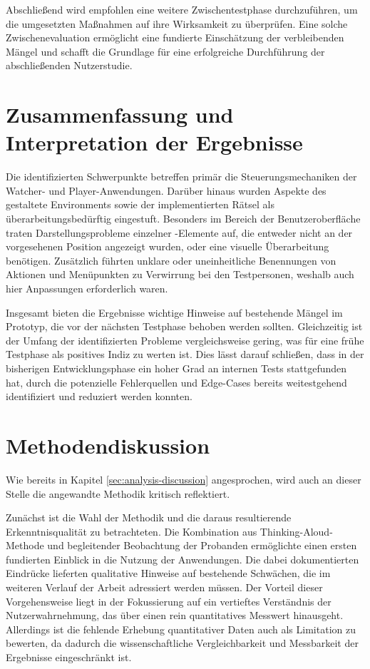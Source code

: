 Abschließend wird empfohlen eine weitere Zwischentestphase durchzuführen, um die umgesetzten Maßnahmen auf ihre Wirksamkeit zu überprüfen. Eine solche Zwischenevaluation ermöglicht eine fundierte Einschätzung der verbleibenden Mängel und schafft die Grundlage für eine erfolgreiche Durchführung der abschließenden Nutzerstudie.

\section{Zusammenfassung und Interpretation der Ergebnisse}

Die identifizierten Schwerpunkte betreffen primär die Steuerungsmechaniken der Watcher- und Player-Anwendungen. Darüber hinaus wurden Aspekte des gestaltete Environments sowie der implementierten Rätsel als überarbeitungsbedürftig eingestuft. Besonders im Bereich der Benutzeroberfläche traten Darstellungsprobleme einzelner -Elemente auf, die entweder nicht an der vorgesehenen Position angezeigt wurden, oder eine visuelle Überarbeitung benötigen. Zusätzlich führten unklare oder uneinheitliche Benennungen von Aktionen und Menüpunkten zu Verwirrung bei den Testpersonen, weshalb auch hier Anpassungen erforderlich waren.

Insgesamt bieten die Ergebnisse wichtige Hinweise auf bestehende Mängel im Prototyp, die vor der nächsten Testphase behoben werden sollten. Gleichzeitig ist der Umfang der identifizierten Probleme vergleichsweise gering, was für eine frühe Testphase als positives Indiz zu werten ist. Dies lässt darauf schließen, dass in der bisherigen Entwicklungsphase ein hoher Grad an internen Tests stattgefunden hat, durch die potenzielle Fehlerquellen und Edge-Cases bereits weitestgehend identifiziert und reduziert werden konnten.

\section{Methodendiskussion}

Wie bereits in Kapitel \ref{sec:analysis-discussion} angesprochen, wird auch an dieser Stelle die angewandte Methodik kritisch reflektiert.

Zunächst ist die Wahl der Methodik und die daraus resultierende Erkenntnisqualität zu betrachteten. Die Kombination aus Thinking-Aloud-Methode und begleitender Beobachtung der Probanden ermöglichte einen ersten fundierten Einblick in die Nutzung der Anwendungen. Die dabei dokumentierten Eindrücke lieferten qualitative Hinweise auf bestehende Schwächen, die im weiteren Verlauf der Arbeit adressiert werden müssen. Der Vorteil dieser Vorgehensweise liegt in der Fokussierung auf ein vertieftes Verständnis der Nutzerwahrnehmung, das über einen rein quantitatives Messwert hinausgeht. Allerdings ist die fehlende Erhebung quantitativer Daten auch als Limitation zu bewerten, da dadurch die wissenschaftliche Vergleichbarkeit und Messbarkeit der Ergebnisse eingeschränkt ist.

